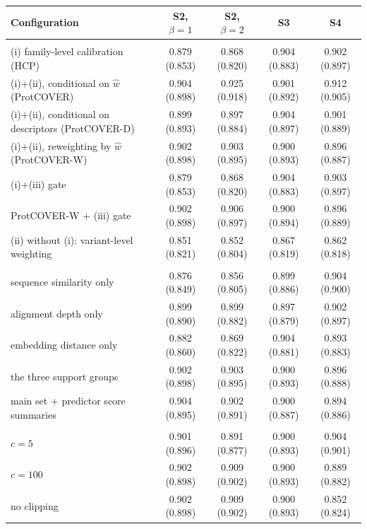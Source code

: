 \begin{tabular}{>{\raggedright\arraybackslash}p{6.9cm}cccc}
\toprule
Configuration & S2, $\beta=1$ & S2, $\beta=2$ & S3 & S4 \\
\midrule
\multicolumn{5}{l}{\emph{Components}} \\
(i) family-level calibration (HCP) & 0.879 (0.853) & 0.868 (0.820) & 0.904 (0.883) & 0.902 (0.897) \\
(i)+(ii), conditional on $\hat w$ (ProtCOVER) & 0.904 (0.898) & 0.925 (0.918) & 0.901 (0.892) & 0.912 (0.905) \\
(i)+(ii), conditional on descriptors (ProtCOVER-D) & 0.899 (0.893) & 0.897 (0.884) & 0.904 (0.897) & 0.901 (0.889) \\
(i)+(ii), reweighting by $\hat w$ (ProtCOVER-W) & 0.902 (0.898) & 0.903 (0.895) & 0.900 (0.893) & 0.896 (0.887) \\
(i)+(iii) gate & 0.879 (0.853) & 0.868 (0.820) & 0.904 (0.883) & 0.903 (0.897) \\
ProtCOVER-W + (iii) gate & 0.902 (0.898) & 0.906 (0.897) & 0.900 (0.894) & 0.896 (0.889) \\
(ii) without (i): variant-level weighting & 0.851 (0.821) & 0.852 (0.804) & 0.867 (0.819) & 0.862 (0.818) \\
\multicolumn{5}{l}{\emph{Descriptors for $\hat w$ (ProtCOVER-W)}} \\
sequence similarity only & 0.876 (0.849) & 0.856 (0.805) & 0.899 (0.886) & 0.904 (0.900) \\
alignment depth only & 0.899 (0.890) & 0.899 (0.882) & 0.897 (0.879) & 0.902 (0.897) \\
embedding distance only & 0.882 (0.860) & 0.869 (0.822) & 0.904 (0.881) & 0.893 (0.883) \\
the three support groups & 0.902 (0.898) & 0.903 (0.895) & 0.900 (0.893) & 0.896 (0.888) \\
main set + predictor score summaries & 0.904 (0.895) & 0.902 (0.891) & 0.900 (0.887) & 0.894 (0.886) \\
\multicolumn{5}{l}{\emph{Weight clipping $c$ (default 20; ProtCOVER-W)}} \\
$c=5$ & 0.901 (0.896) & 0.891 (0.877) & 0.900 (0.893) & 0.904 (0.901) \\
$c=100$ & 0.902 (0.898) & 0.909 (0.902) & 0.900 (0.893) & 0.889 (0.882) \\
no clipping & 0.902 (0.898) & 0.909 (0.902) & 0.900 (0.893) & 0.852 (0.824) \\
\bottomrule
\end{tabular}
